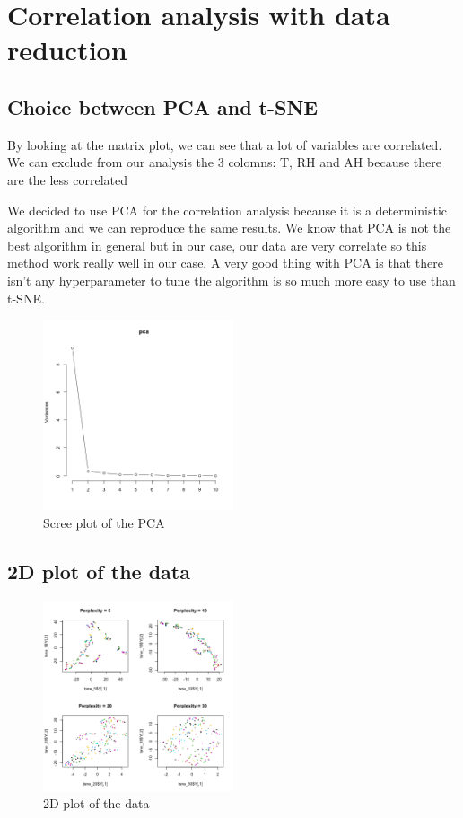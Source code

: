 \section{Correlation analysis with data reduction}

\subsection{Choice between PCA and t-SNE}
By looking at the matrix plot, we can see that a lot of variables are correlated. We can exclude from our analysis the 3 colomns: T, RH and AH because there are the less correlated

We decided to use PCA for the correlation analysis because it is a deterministic algorithm and we can reproduce the same results. 
We know that PCA is not the best algorithm in general but in our case, our data are very correlate so this method work really well in our case. 
A very good thing with PCA is that there isn't any hyperparameter to tune the algorithm is so much more easy to use than t-SNE.

\begin{figure}[h]
\centering
\includegraphics[width=0.5\textwidth]{figs/pca.png}
\caption{Scree plot of the PCA}
\label{fig:scree_plot}
\end{figure}





\subsection{2D plot of the data}


\begin{figure}[H]
\centering
\includegraphics[width=0.5\textwidth]{figs/tsne.png}
\caption{2D plot of the data}
\label{fig:2d_plot}
\end{figure}
